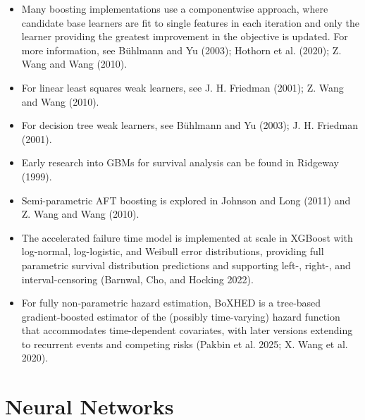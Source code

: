 \documentclass[
  letterpaper,
  krantz2]{style/krantz}
\providecommand{\tightlist}{%
  \setlength{\itemsep}{0pt}\setlength{\parskip}{0pt}}
\begin{document}
\begin{tcolorbox}[enhanced jigsaw, toprule=.15mm, bottomtitle=1mm, opacityback=0, breakable, leftrule=.75mm, title={Further reading}, toptitle=1mm, bottomrule=.15mm, colback=white, colframe=quarto-callout-tip-color-frame, titlerule=0mm, opacitybacktitle=0.6, coltitle=black, rightrule=.15mm, left=2mm, colbacktitle=quarto-callout-tip-color!10!white, arc=.35mm]

\begin{itemize}
\tightlist
\item
  Many boosting implementations use a componentwise approach, where
  candidate base learners are fit to single features in each iteration
  and only the learner providing the greatest improvement in the
  objective is updated. For more information, see Bühlmann and Yu
  (2003); Hothorn et al. (2020); Z. Wang and Wang (2010).
\item
  For linear least squares weak learners, see J. H. Friedman (2001); Z.
  Wang and Wang (2010).
\item
  For decision tree weak learners, see Bühlmann and Yu (2003); J. H.
  Friedman (2001).
\item
  Early research into GBMs for survival analysis can be found in
  Ridgeway (1999).
\item
  Semi-parametric AFT boosting is explored in Johnson and Long (2011)
  and Z. Wang and Wang (2010).
\item
  The accelerated failure time model is implemented at scale in XGBoost
  with log-normal, log-logistic, and Weibull error distributions,
  providing full parametric survival distribution predictions and
  supporting left-, right-, and interval-censoring (Barnwal, Cho, and
  Hocking 2022).
\item
  For fully non-parametric hazard estimation, BoXHED is a tree-based
  gradient-boosted estimator of the (possibly time-varying) hazard
  function that accommodates time-dependent covariates, with later
  versions extending to recurrent events and competing risks (Pakbin et
  al. 2025; X. Wang et al. 2020).
\end{itemize}

\end{tcolorbox}

\chapter{Neural Networks}\label{sec-nnet}
\end{document}
